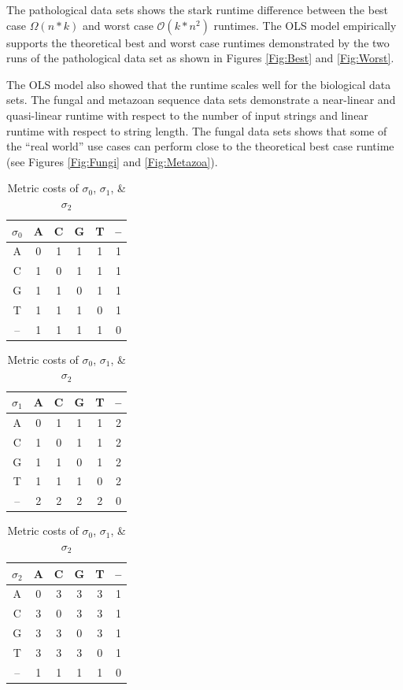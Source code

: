\documentclass[11pt]{article}
\begin{document}
The pathological data sets shows the stark runtime difference between the best case $\Omega(n * k)$ and worst case $\mathcal{O}(k * n^2)$ runtimes.
The OLS model empirically supports the theoretical best and worst case runtimes demonstrated by the two runs of the pathological data set as shown in Figures \ref{Fig:Best} and \ref{Fig:Worst}. %

The OLS model also showed that the runtime scales well for the biological data sets.
The fungal and metazoan sequence data sets demonstrate a near-linear and quasi-linear runtime with respect to the number of input strings and linear runtime with respect to string length.
The fungal data sets shows that some of the ``real world'' use cases can perform close to the theoretical best case runtime (see Figures \ref{Fig:Fungi} and \ref{Fig:Metazoa}). %


\begin{table}[!hbt]
\caption{Metric costs of $\sigma_0$, $\sigma_1$, \& $\sigma_2$}
\label{Tab:Metrics}
\begin{minipage}{0.3\textwidth}
	\centering
	\begin{tabular}{c|ccccc}
		$\sigma_0$ & A & C & G & T & -- \\ \hline
		A  & 0 & 1 & 1 & 1 & 1  \\
		C  & 1 & 0 & 1 & 1 & 1  \\
		G  & 1 & 1 & 0 & 1 & 1  \\
		T  & 1 & 1 & 1 & 0 & 1  \\
		-- & 1 & 1 & 1 & 1 & 0
	\end{tabular}
\end{minipage}
\hfill
\begin{minipage}{0.33\textwidth}
\centering
\begin{tabular}{c|ccccc}
$\sigma_1$ & A & C & G & T & -- \\ \hline
        A  & 0 & 1 & 1 & 1 & 2  \\
        C  & 1 & 0 & 1 & 1 & 2  \\
        G  & 1 & 1 & 0 & 1 & 2  \\
        T  & 1 & 1 & 1 & 0 & 2  \\
        -- & 2 & 2 & 2 & 2 & 0
\end{tabular}
\end{minipage}
\hfill
\begin{minipage}{0.3\textwidth}
\centering
\begin{tabular}{c|ccccc}
$\sigma_2$ & A & C & G & T & -- \\ \hline
        A  & 0 & 3 & 3 & 3 & 1  \\
        C  & 3 & 0 & 3 & 3 & 1  \\
        G  & 3 & 3 & 0 & 3 & 1  \\
        T  & 3 & 3 & 3 & 0 & 1  \\
        -- & 1 & 1 & 1 & 1 & 0
\end{tabular}
\end{minipage}
\end{table}
\end{document}
